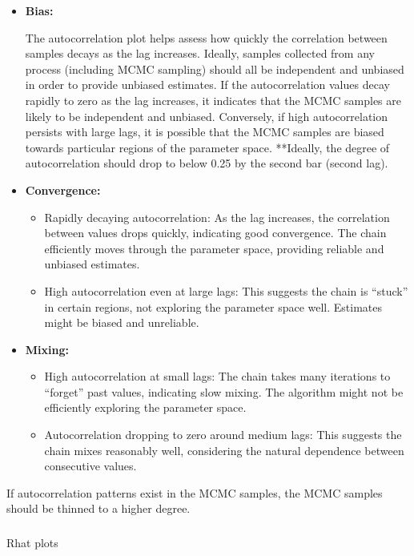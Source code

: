 \documentclass[
  8pt,
  a4paper]{article}
\makeatletter
\let\oldsubparagraph\subparagraph
\renewcommand{\subparagraph}{
    \@ifstar
      \xxxSubParagraphStar
      \xxxSubParagraphNoStar
  }
\newcommand{\xxxSubParagraphStar}[1]{\oldsubparagraph*{#1}\mbox{}}
\newcommand{\xxxSubParagraphNoStar}[1]{\oldsubparagraph{#1}\mbox{}}
\makeatother
\begin{document}
\begin{itemize}
\item
  \textbf{Bias:}

  The autocorrelation plot helps assess how quickly the correlation
  between samples decays as the lag increases. Ideally, samples
  collected from any process (including MCMC sampling) should all be
  independent and unbiased in order to provide unbiased estimates. If
  the autocorrelation values decay rapidly to zero as the lag increases,
  it indicates that the MCMC samples are likely to be independent and
  unbiased. Conversely, if high autocorrelation persists with large
  lags, it is possible that the MCMC samples are biased towards
  particular regions of the parameter space. **Ideally, the degree of
  autocorrelation should drop to below 0.25 by the second bar (second
  lag).
\item
  \textbf{Convergence:}

  \begin{itemize}
  \item
    Rapidly decaying autocorrelation: As the lag increases, the
    correlation between values drops quickly, indicating good
    convergence. The chain efficiently moves through the parameter
    space, providing reliable and unbiased estimates.
  \item
    High autocorrelation even at large lags: This suggests the chain is
    ``stuck'' in certain regions, not exploring the parameter space
    well. Estimates might be biased and unreliable.
  \end{itemize}
\item
  \textbf{Mixing:}

  \begin{itemize}
  \item
    High autocorrelation at small lags: The chain takes many iterations
    to ``forget'' past values, indicating slow mixing. The algorithm
    might not be efficiently exploring the parameter space.
  \item
    Autocorrelation dropping to zero around medium lags: This suggests
    the chain mixes reasonably well, considering the natural dependence
    between consecutive values.
  \end{itemize}
\end{itemize}

If autocorrelation patterns exist in the MCMC samples, the MCMC samples
should be thinned to a higher degree.

\subparagraph{Rhat plots}\label{rhat-plots}
\end{document}
